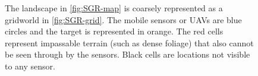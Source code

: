 \begin{figure}
{}


\caption{The landscape in \ref{fig:SGR-map} is coarsely represented as a gridworld in \ref{fig:SGR-grid}. The mobile sensors or UAVs are blue circles and the target is represented in orange. The red cells represent impassable terrain (such as dense foliage) that also cannot be seen through by the sensors. Black cells are locations not visible to any sensor.}
\label{fig:casestudy}
\end{figure}

